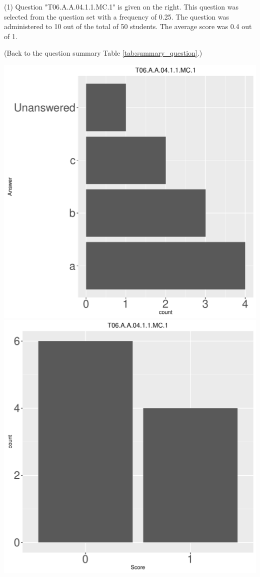 \documentclass[12pt,english,nohyper]{tufte-handout}\usepackage[]{graphicx}\usepackage[]{color}
\begin{document}
 (1) Question "T06.A.A.04.1.1.MC.1" is given on the right. This question was selected from the question set with a frequency of 0.25. The question was administered to 10 out of the total of 50 students. The average score was 0.4 out of 1.

 (Back to the question summary Table \ref{tab:summary_question}.)

\begin{center} \includegraphics[width=.45\linewidth]{Topic06_AB_1_answer} \includegraphics[width=.45\linewidth]{Topic06_AB_1_score} \end{center} 
\end{document}
